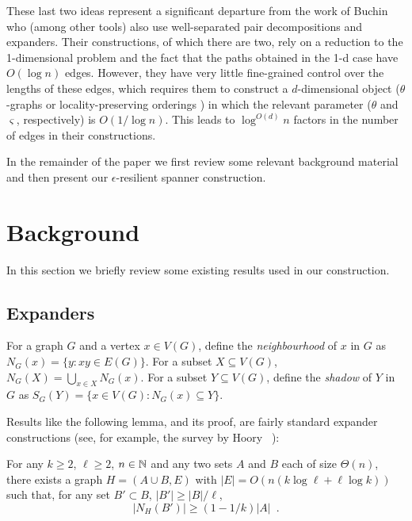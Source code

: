 \documentclass{patmorin}
\begin{document}
These last two ideas represent a significant departure from the work of
Buchin \etal\ \cite{buchin.har-peled.ea:spanner} who 
(among other tools) also use well-separated
pair decompositions and expanders.  Their constructions, of
which there are two, rely on a reduction to the 1-dimensional problem
and the fact that the paths obtained in the 1-d case have $O(\log n)$ edges.
However, they have very little fine-grained control over the lengths of
these edges, which requires them to construct a $d$-dimensional object
($\theta$-graphs  \cite{keil.gutwin:classes} or locality-preserving orderings \cite{chan.har-peled.ea:on}) in which the relevant
parameter ($\theta$ and $\varsigma$, respectively) is $O(1/\log n)$.  This leads
to $\log^{O(d)} n$ factors in the number of edges in their constructions.

In the remainder of the paper we first review some relevant background material and then present our $\epsilon$-resilient spanner construction.

\section{Background}

In this section we briefly review some existing results used in our
construction.

\subsection{Expanders}

For a graph $G$ and a vertex $x\in V(G)$, define the \emph{neighbourhood}
of $x$ in $G$ as $N_G(x) = \{ y: xy\in E(G)\}$.  For a subset $X\subseteq
V(G)$, $N_G(X)=\bigcup_{x\in X} N_G(x)$.  For a subset $Y\subseteq
V(G)$, define the \emph{shadow} of $Y$ in $G$ as $S_G(Y) = \{x\in V(G):
N_G(x)\subseteq Y\}$.

Results like the following lemma, and its proof, are fairly standard
expander constructions (see, for example, the survey by Hoory \etal\
\cite{hoory.linial.ea:expanders}):

\begin{lem}
   For any $k\ge 2$, $\ell\ge 2$, $n\in\mathbb{N}$ and any two sets $A$ and $B$
   each of size $\Theta(n)$, there exists a graph $H=(A\cup B,E)$
   with $|E|=O(n(k\log \ell + \ell\log k))$ such that, for any set $B'\subset B$, $|B'|\ge |B|/\ell$, \[ |N_H(B')| \ge (1-1/k)|A| \enspace . \]
\end{lem}
\end{document}
